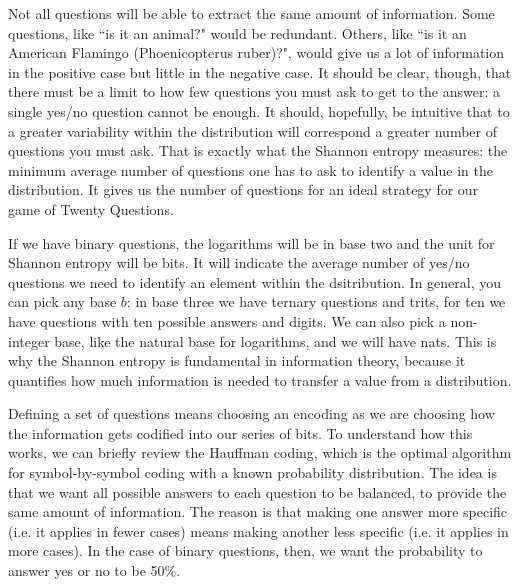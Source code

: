 \documentclass{article}
\begin{document}
Not all questions will be able to extract the same amount of information. Some questions, like ``is it an animal?" would be redundant. Others, like ``is it an American Flamingo (Phoenicopterus ruber)?", would give us a lot of information in the positive case but little in the negative case. It should be clear, though, that there must be a limit to how few questions you must ask to get to the answer: a single yes/no question cannot be enough. It should, hopefully, be intuitive that to a greater variability within the distribution will correspond a greater number of questions you must ask. That is exactly what the Shannon entropy measures: the minimum average number of questions one has to ask to identify a value in the distribution. It gives us the number of questions for an ideal strategy for our game of Twenty Questions.

If we have binary questions, the logarithms will be in base two and the unit for Shannon entropy will be bits. It will indicate the average number of yes/no questions we need to identify an element within the dsitribution. In general, you can pick any base $b$: in base three we have ternary questions and trits, for ten we have questions with ten possible answers and digits. We can also pick a non-integer base, like the natural base for logarithms, and we will have nats. This is why the Shannon entropy is fundamental in information theory, because it quantifies how much information is needed to transfer a value from a distribution.

Defining a set of questions means choosing an encoding as we are choosing how the information gets codified into our series of bits. To understand how this works, we can briefly review the Hauffman coding, which is the optimal algorithm for symbol-by-symbol coding with a known probability distribution. The idea is that we want all possible answers to each question to be balanced, to provide the same amount of information. The reason is that making one answer more specific (i.e. it applies in fewer cases) means making another less specific (i.e. it applies in more cases). In the case of binary questions, then, we want the probability to answer yes or no to be 50\%.
\end{document}
